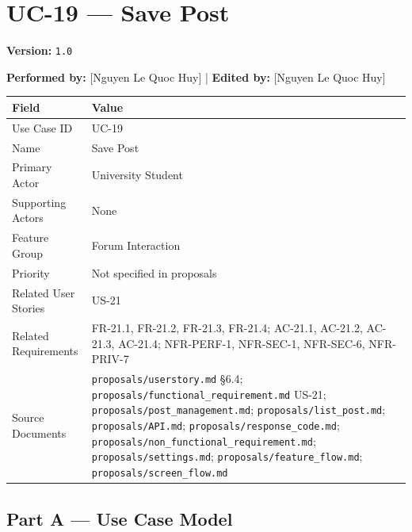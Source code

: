 \documentclass[12pt]{article}
\renewcommand{\baselinestretch}{1.5}
\begin{document}
\pagebreak
\hypertarget{sec:uc-19-save-post}{}
\section*{UC-19 --- Save Post}
\par\medskip

\textbf{Version:} \texttt{1.0}
\par\medskip

\textbf{Performed by:} [Nguyen Le Quoc Huy] | \textbf{Edited by:} [Nguyen Le Quoc Huy]
\par\medskip

\begingroup
\small
\renewcommand{\baselinestretch}{1.0}\selectfont
\renewcommand{\arraystretch}{1.15}
\setlength{\tabcolsep}{6pt}
\begin{longtable}{|>{\raggedright\arraybackslash}p{}|>{\raggedright\arraybackslash}p{}|}
\hline
\textbf{Field} & \textbf{Value} \\ \hline
\endhead
Use Case ID & UC-19 \\ \hline
Name & Save Post \\ \hline
Primary Actor & University Student \\ \hline
Supporting Actors & None \\ \hline
Feature Group & Forum Interaction \\ \hline
Priority & Not specified in proposals \\ \hline
Related User Stories & US-21 \\ \hline
Related Requirements & FR-21.1, FR-21.2, FR-21.3, FR-21.4; AC-21.1, AC-21.2, AC-21.3, AC-21.4; NFR-PERF-1, NFR-SEC-1, NFR-SEC-6, NFR-PRIV-7 \\ \hline
Source Documents & \texttt{proposals/userstory.md} §6.4; \texttt{proposals/functional\_requirement.md} US-21; \texttt{proposals/post\_management.md}; \texttt{proposals/list\_post.md}; \texttt{proposals/API.md}; \texttt{proposals/response\_code.md}; \texttt{proposals/non\_functional\_requirement.md}; \texttt{proposals/settings.md}; \texttt{proposals/feature\_flow.md}; \texttt{proposals/screen\_flow.md} \\ \hline
\end{longtable}
\endgroup
\par\medskip

\hypertarget{sec:part-a-use-case-model}{}
\subsection*{Part A --- Use Case Model}
\par\medskip
\end{document}
